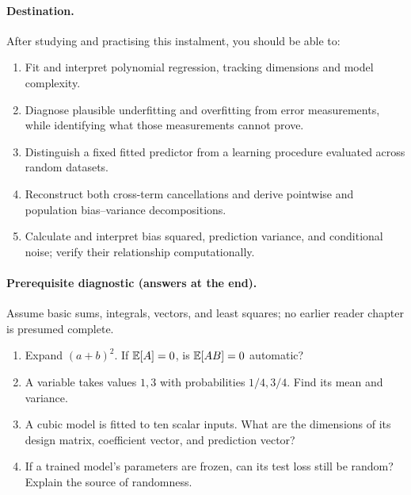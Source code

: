 \paragraph{Destination.} After studying and practising this instalment, you should be able to:
\begin{enumerate}[label=O\arabic*.,leftmargin=*]
\item Fit and interpret polynomial regression, tracking dimensions and model complexity.
\item Diagnose plausible underfitting and overfitting from error measurements, while identifying what those measurements cannot prove.
\item Distinguish a fixed fitted predictor from a learning procedure evaluated across random datasets.
\item Reconstruct both cross-term cancellations and derive pointwise and population bias--variance decompositions.
\item Calculate and interpret bias squared, prediction variance, and conditional noise; verify their relationship computationally.
\end{enumerate}
\paragraph{Prerequisite diagnostic (answers at the end).} Assume basic sums, integrals, vectors, and least squares; no earlier reader chapter is presumed complete.
\begin{enumerate}[label=D\arabic*.]
\item Expand $(a+b)^2$. If $\mathbb{E}[A]=0$, is $\mathbb{E}[AB]=0$ automatic?
\item A variable takes values $1,3$ with probabilities $1/4,3/4$. Find its mean and variance.
\item A cubic model is fitted to ten scalar inputs. What are the dimensions of its design matrix, coefficient vector, and prediction vector?
\item If a trained model's parameters are frozen, can its test loss still be random? Explain the source of randomness.
\end{enumerate}

